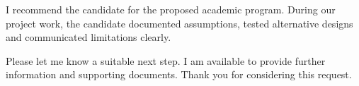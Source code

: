 I recommend the candidate for the proposed academic program. During our project work, the candidate documented assumptions, tested alternative designs and communicated limitations clearly.

Please let me know a suitable next step. I am available to provide further information and supporting documents. Thank you for considering this request.

